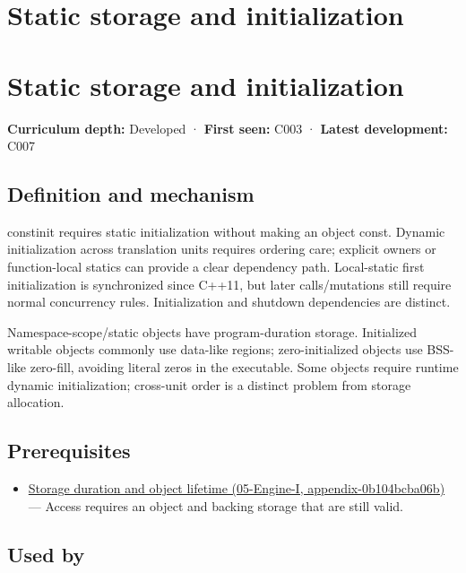 \hypertarget{appendix-17c93c4c2f19}{}
\section*{Static storage and initialization}
\section{Static storage and initialization}\label{appendix-17c93c4c2f19-static-storage-and-initialization}

\textbf{Curriculum depth:} Developed · \textbf{First seen:} C003 · \textbf{Latest development:} C007

\subsection{Definition and mechanism}\label{appendix-17c93c4c2f19-definition-and-mechanism}

constinit requires static initialization without making an object const. Dynamic initialization across translation units requires ordering care; explicit owners or function-local statics can provide a clear dependency path. Local-static first initialization is synchronized since C++11, but later calls/mutations still require normal concurrency rules. Initialization and shutdown dependencies are distinct.

Namespace-scope/static objects have program-duration storage. Initialized writable objects commonly use data-like regions; zero-initialized objects use BSS-like zero-fill, avoiding literal zeros in the executable. Some objects require runtime dynamic initialization; cross-unit order is a distinct problem from storage allocation.

\subsection{Prerequisites}\label{appendix-17c93c4c2f19-prerequisites}

\begin{itemize}
\tightlist
\item
  \href{../05-Engine-I/main.pdf\#nameddest=appendix-0b104bcba06b}{Storage duration and object lifetime (05-Engine-I, appendix-0b104bcba06b)} --- Access requires an object and backing storage that are still valid.
\end{itemize}

\subsection{Used by}\label{appendix-17c93c4c2f19-used-by}

